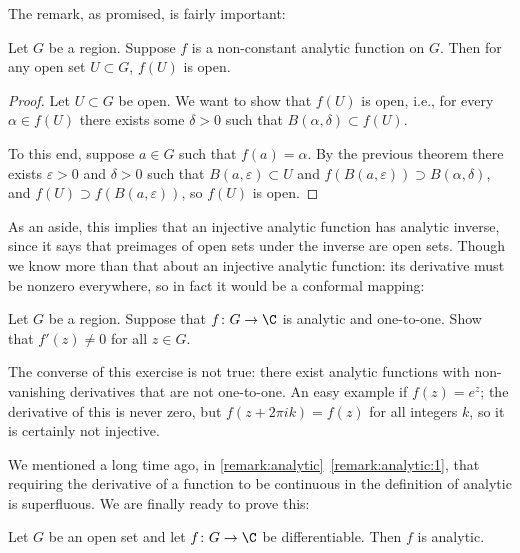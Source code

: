 The remark, as promised, is fairly important:

\begin{theorem}\label{thm4.11}
	Let $G$ be a region.
	Suppose $f$ is a non-constant analytic function on $G$.
	Then for any open set $U \subset G$, $f(U)$ is open.
\end{theorem}

\begin{proof}
	Let $U \subset G$ be open.
	We want to show that $f(U)$ is open, i.e., for every $\alpha \in f(U)$ there exists some $\delta > 0$ such that $B(\alpha, \delta) \subset f(U)$.

	To this end, suppose $a \in G$ such that $f(a) = \alpha$.
	By the previous theorem there exists $\varepsilon > 0$ and $\delta > 0$ such that $B(a, \varepsilon) \subset U$ and $f(B(a, \varepsilon)) \supset B(\alpha, \delta)$, and $f(U) \supset f(B(a, \varepsilon))$, so $f(U)$ is open.
\end{proof}

As an aside, this implies that an injective analytic function has analytic inverse, since it says that preimages of open sets under the inverse are open sets.
Though we know more than that about an injective analytic function: its derivative must be nonzero everywhere, so in fact it would be a conformal mapping:

\begin{exercise}\label{hw3.1}
	Let $G$ be a region.
	Suppose that $f \colon G \to \C$ is analytic and one-to-one.
	Show that $f'(z) \neq 0$ for all $z \in G$.
\end{exercise}

\begin{remark}
	The converse of this exercise is not true: there exist analytic functions with non-vanishing derivatives that are not one-to-one.
	An easy example if $f(z) =e^z$; the derivative of this is never zero, but $f(z + 2 \pi i k) = f(z)$ for all integers $k$, so it is certainly not injective.
\end{remark}

We mentioned a long time ago, in \autoref{remark:analytic}~\ref{remark:analytic:1}, that requiring the derivative of a function to be continuous in the definition of analytic is superfluous.
We are finally ready to prove this:

\begin{theorem}\label{thm4.12}
	Let $G$ be an open set and let $f \colon G \to \C$ be differentiable.
	Then $f$ is analytic.
\end{theorem}

